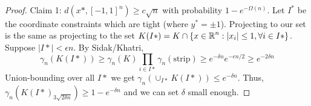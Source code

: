 \begin{proof}
    Claim 1: $d(x*, [-1, 1]^n) \ge c\sqrt{n}$ with probability $1 - e^{-\Omega(n)}$.
    Let $I^*$ be the coordinate constraints which are tight (where $y^* = \pm 1$).
    Projecting to our set is the same as projecting to the set $K(I*) = K \cap \{ x \in \operatorname{\mathbb{R}}^n: |x_i| \le 1, \forall i \in I*\}$.
    Suppose $|I*| <\epsilon n$. By Sidak/Khatri, 
    \[ \gamma_n(K(I*)) \ge \gamma_n(K) \prod_{i \in I*} \gamma_n(\text{strip}) \ge e^{-\delta n}
     e^{-\epsilon n/2} \ge e^{-2\delta n} \]
    Union-bounding over all $I*$ we get $\gamma_n(\cup_{I*} K(I*)) \le e^{-\delta n}$.
    Thus, $\gamma_n(K(I*)_{3\sqrt{2\delta n}}) \ge 1 -e^{-\delta n}$ and we can set $\delta$ small enough.
\end{proof}